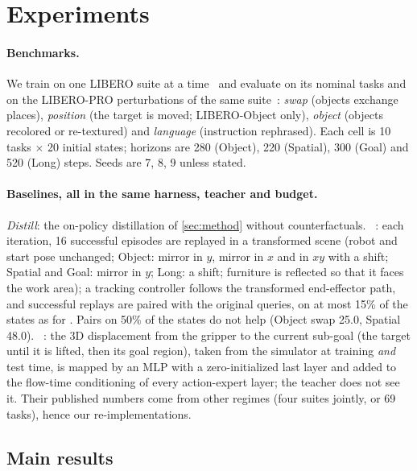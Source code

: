 \section{Experiments}
\label{sec:exp}

\paragraph{Benchmarks.}
We train on one LIBERO suite at a time~\cite{liu2023libero} and evaluate on its nominal tasks and on the LIBERO-PRO
perturbations of the same suite~\cite{zhou2025liberopro}: \emph{swap} (objects exchange places), \emph{position} (the
target is moved; LIBERO-Object only), \emph{object} (objects recolored or re-textured) and \emph{language} (instruction
rephrased). Each cell is 10 tasks $\times$ 20 initial states; horizons are 280 (Object), 220 (Spatial), 300 (Goal) and 520
(Long) steps. Seeds are 7, 8, 9 unless stated.

\paragraph{Baselines, all in the same harness, teacher and budget.}
\emph{Distill}: the on-policy distillation of \cref{sec:method} without counterfactuals.
\emph{\ect}~\cite{chen2026ect}: each iteration, 16 successful episodes are replayed in a transformed scene (robot and start
pose unchanged; Object: mirror in $y$, mirror in $x$ and in $xy$ with a shift; Spatial and Goal: mirror in $y$; Long: a
shift; furniture is reflected so that it faces the work area); a tracking controller follows the transformed end-effector
path, and successful replays are paired with the original queries, on at most 15\% of the states as for \ours.
Pairs on 50\% of the states do not help \ect (Object swap 25.0, Spatial 48.0).
\emph{\pt}~\cite{tsai2026point}: the 3D displacement from the gripper to the current sub-goal (the target until it is
lifted, then its goal region), taken from the simulator at training \emph{and} test time, is mapped by an MLP with a
zero-initialized last layer and added to the flow-time conditioning of every action-expert layer; the teacher does not see
it. Their published numbers come from other regimes (four suites jointly, or 69 tasks), hence our re-implementations.

\subsection{Main results}
\label{sec:exp:main}

